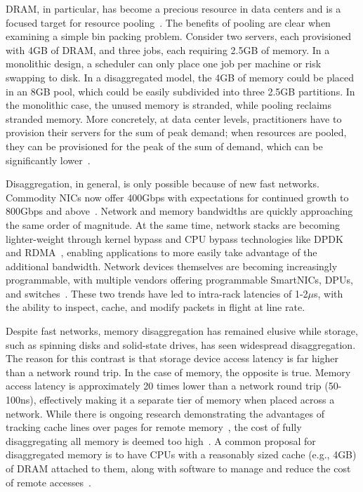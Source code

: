 \documentclass[12pt]{ucsddissertation}
\begin{document}
\begin{dissertationintroduction}
DRAM, in particular, has become a precious resource in data centers and is a focused target for
resource pooling~\cite{micron-memorywall}. The benefits of pooling are clear when examining a simple
bin packing problem. Consider two servers, each provisioned with 4GB of DRAM, and three jobs, each
requiring 2.5GB of memory. In a monolithic design, a scheduler can only place one job per machine or
risk swapping to disk. In a disaggregated model, the 4GB of memory could be placed in an 8GB pool,
which could be easily subdivided into three 2.5GB partitions. In the monolithic case, the unused
memory is stranded, while pooling reclaims stranded memory. More concretely, at data center levels,
practitioners have to provision their servers for the sum of peak demand; when resources are pooled,
they can be provisioned for the peak of the sum of demand, which can be significantly
lower~\cite{ dsnf, supernic}.

Disaggregation, in general, is only possible because of new fast networks. Commodity NICs now offer
400Gbps with expectations for continued growth to 800Gbps and above~\cite{cx8}. Network and memory
bandwidths are quickly approaching the same order of magnitude. At the same time, network stacks are
becoming lighter-weight through kernel bypass and CPU bypass technologies like DPDK~\cite{dpdk} and
RDMA~\cite{infiniband-spec}, enabling applications to more easily take advantage of the additional
bandwidth. Network devices themselves are becoming increasingly programmable, with multiple vendors
offering programmable SmartNICs, DPUs, and switches~\cite{tofino2,bluefield,pensando}. These two
trends have led to intra-rack latencies of 1-2{$\mu$}s, with the ability to inspect, cache, and
modify packets in flight at line rate.


Despite fast networks, memory disaggregation has remained elusive while storage, such as spinning
disks and solid-state drives, has seen widespread disaggregation. The reason for this contrast is
that storage device access latency is far higher than a network round trip. In the case of memory,
the opposite is true. Memory access latency is approximately 20 times lower than a network round
trip (50-100ns), effectively making it a separate tier of memory when placed across a network. While
there is ongoing research demonstrating the advantages of tracking cache lines over pages for remote
memory~\cite{kona}, the cost of fully disaggregating all memory is deemed too high~\cite{legoos}. A common
proposal for disaggregated memory is to have CPUs with a reasonably sized cache (e.g., 4GB) of DRAM
attached to them, along with software to manage and reduce the cost of remote
accesses~\cite{legoos}.


\end{dissertationintroduction}
\end{document}
